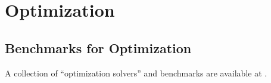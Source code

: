 









\chapter{Optimization}
\label{chp:Optimization}


\section{Benchmarks for Optimization}
\label{sec:BenchmarksForOptimization}

A collection of ``optimization solvers'' and benchmarks are available at \cite{Dongarra2016}. \\

